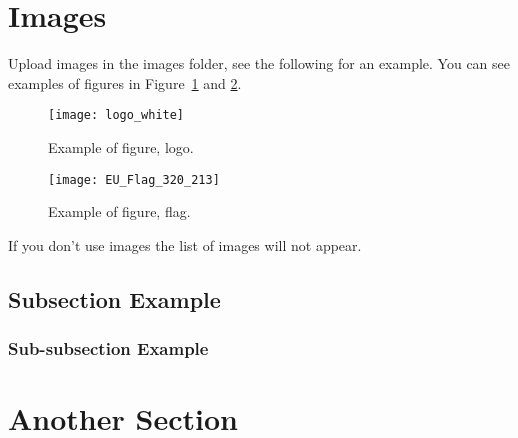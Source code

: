 \section{Images}
Upload images in the images folder, see the following for an example.
You can see examples of figures in Figure~\ref{fig:my_label} and \ref{fig:my_label2}.
\begin{figure}
    \centering
    \texttt{[image: logo\_white]}
    \caption{Example of figure, logo.}
    \label{fig:my_label}
\end{figure}

\begin{figure}
    \centering
    \texttt{[image: EU\_Flag\_320\_213]}
    \caption{Example of figure, flag.}
    \label{fig:my_label2}
\end{figure}
If you don't use images the list of images will not appear.

\subsection{Subsection Example}
\lipsum[1]
\subsubsection{Sub-subsection Example}


\lipsum[3-6]


\section{Another Section}


\lipsum[7-9]
 